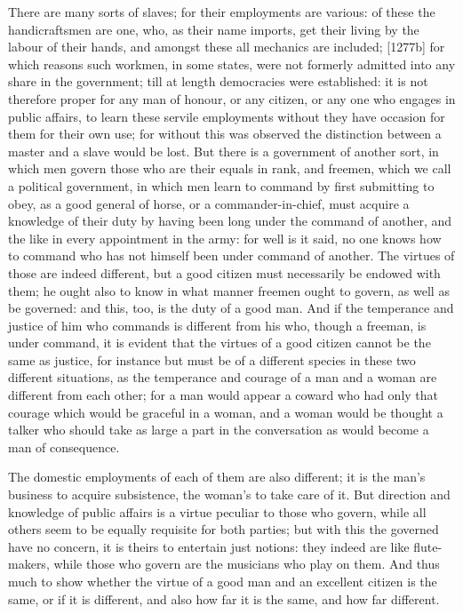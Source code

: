 There are many sorts of slaves; for their employments are various: of
these the handicraftsmen are one, who, as their name imports, get their
living by the labour of their hands, and amongst these all mechanics are
included; [1277b] for which reasons such workmen, in some states, were not
formerly admitted into any share in the government; till at length
democracies were established: it is not therefore proper for any man of
honour, or any citizen, or any one who engages in public affairs, to learn
these servile employments without they have occasion for them for their
own use; for without this was observed the distinction between a master
and a slave would be lost. But there is a government of another sort, in
which men govern those who are their equals in rank, and freemen, which we
call a political government, in which men learn to command by first
submitting to obey, as a good general of horse, or a commander-in-chief,
must acquire a knowledge of their duty by having been long under the
command of another, and the like in every appointment in the army: for
well is it said, no one knows how to command who has not himself been
under command of another. The virtues of those are indeed different, but a
good citizen must necessarily be endowed with them; he ought also to know
in what manner freemen ought to govern, as well as be governed: and this,
too, is the duty of a good man. And if the temperance and justice of him
who commands is different from his who, though a freeman, is under
command, it is evident that the virtues of a good citizen cannot be the
same as justice, for instance but must be of a different species in these
two different situations, as the temperance and courage of a man and a
woman are different from each other; for a man would appear a coward who
had only that courage which would be graceful in a woman, and a woman
would be thought a talker who should take as large a part in the
conversation as would become a man of consequence.

The domestic employments of each of them are also different; it is the
man's business to acquire subsistence, the woman's to take care of it. But
direction and knowledge of public affairs is a virtue peculiar to those
who govern, while all others seem to be equally requisite for both
parties; but with this the governed have no concern, it is theirs to
entertain just notions: they indeed are like flute-makers, while those who
govern are the musicians who play on them. And thus much to show whether
the virtue of a good man and an excellent citizen is the same, or if it is
different, and also how far it is the same, and how far different.

